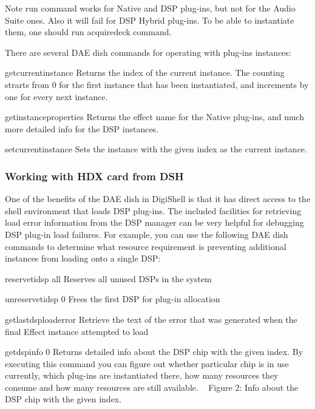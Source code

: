 \begin{DoxyNote}{Note}
{\ttfamily run} command works for Native and D\+S\+P plug-\/ins, but not for the Audio Suite ones. Also it will fail for D\+S\+P Hybrid plug-\/ins. To be able to instantiate them, one should run {\ttfamily acquiredeck} command.
\end{DoxyNote}
There are several D\+A\+E dish commands for operating with plug-\/ins\textquotesingle{} instances\+: 
\begin{DoxyItemize}
\item {\ttfamily getcurrentinstance} Returns the index of the current instance. The counting strarts from 0 for the first instance that has been instantiated, and increments by one for every next instance. ~\newline
  
\item {\ttfamily getinstanceproperties} Returns the effect name for the Native plug-\/ins, and much more detailed info for the D\+S\+P instances.  
\item {\ttfamily setcurrentinstance} Sets the instance with the given index as the current instance.  
\end{DoxyItemize}

\hypertarget{a00365_subsection__working_with_hdx_card_from_dsh}{}\subsubsection{Working with H\+D\+X card from D\+S\+H}\label{a00365_subsection__working_with_hdx_card_from_dsh}
 One of the benefits of the D\+A\+E dish in Digi\+Shell is that it has direct access to the shell environment that loads D\+S\+P plug-\/ins. The included facilities for retrieving load error information from the D\+S\+P manager can be very helpful for debugging D\+S\+P plug-\/in load failures. For example, you can use the following D\+A\+E dish commands to determine what resource requirement is preventing additional instances from loading onto a single D\+S\+P\+: 
\begin{DoxyEnumerate}
\item {\ttfamily reservetidsp all} Reserves all unused D\+S\+Ps in the system  
\item {\ttfamily unreservetidsp 0} Frees the first D\+S\+P for plug-\/in allocation  
\item {\ttfamily getlastdsploaderror} Retrieve the text of the error that was generated when the final Effect instance attempted to load  
\item {\ttfamily getdspinfo 0} Returns detailed info about the D\+S\+P chip with the given index. By executing this command you can figure out whether particular chip is in use currently, which plug-\/ins are instantiated there, how many resources they consume and how many resources are still available. ~\newline
   Figure 2\+: Info about the D\+S\+P chip with the given index.  
\end{DoxyEnumerate}

